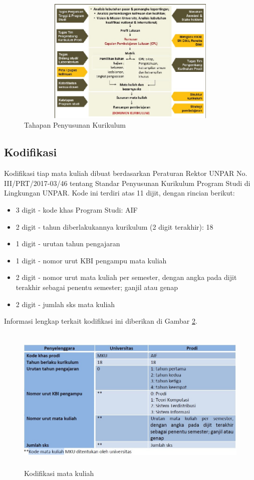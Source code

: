 \begin{figure}[H]
    \centering
    \includegraphics[width=12cm, height=6cm]{Gambar/Penyusunan Kurikulum.jpg}
    \caption{Tahapan Penyusunan Kurikulum}
    \label{fig:gambar1}
\end{figure}

\subsection{Kodifikasi}
Kodifikasi tiap mata kuliah dibuat berdasarkan Peraturan Rektor UNPAR No. III/PRT/2017-03/46 tentang Standar Penyusunan Kurikulum Program Studi di Lingkungan UNPAR. Kode ini terdiri atas 11 dijit, dengan rincian berikut:

\begin{itemize}
    \item 3 digit - kode khas Program Studi: AIF
    \item 2 digit - tahun diberlakukannya kurikulum (2 digit terakhir): 18
    \item 1 digit - urutan tahun pengajaran
    \item 1 digit - nomor urut KBI pengampu mata kuliah
    \item 2 digit - nomor urut mata kuliah per semester, dengan angka pada dijit terakhir sebagai penentu semester; ganjil atau genap
    \item 2 digit - jumlah sks mata kuliah
\end{itemize}

Informasi lengkap terkait kodifikasi ini diberikan di Gambar \ref{fig:gambar2}.

\begin{figure}[H]
    \centering
    \includegraphics[width=12cm, height=7cm]{Gambar/Kode mata kuliah.jpg}
    \caption{Kodifikasi mata kuliah}
    \label{fig:gambar2}
\end{figure}

